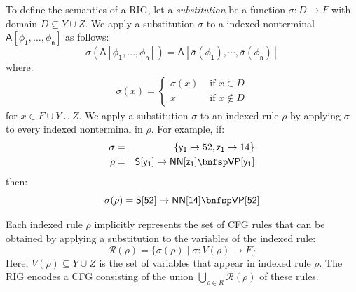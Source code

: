 \documentclass[11pt]{article}
\renewcommand{\bnfpn}[1]{\mathsf{#1}}
\renewcommand{\bnfpo}{\rightarrow}
\renewcommand{\bnfts}[1]{\mathtt{#1}}
\begin{document}
To define the semantics of a RIG, let a \emph{substitution} be a function $\sigma: D \rightarrow F$ with domain $D \subseteq Y \cup Z$. We apply a substitution $\sigma$ to a indexed nonterminal $\bnfpn{A[\phi_1, \dots, \phi_n]}$ as follows:
\begin{equation*}
\sigma(\bnfpn{A[\phi_1, \dots, \phi_n]}) = \bnfpn{A[\bar{\sigma}(\phi_1), \cdots, \bar{\sigma}(\phi_n)]}
\end{equation*}
where:
\begin{gather*}
\bar{\sigma}(x) = \begin{cases}
         \sigma(x) &\mbox{ if } x \in D\\
         x &\mbox{ if } x \not\in D
       \end{cases}
\end{gather*}
\noindent for $x \in F \cup Y \cup Z$. We apply a substitution $\sigma$ to an indexed rule $\rho$ by applying $\sigma$ to every indexed nonterminal in $\rho$.
For example, if:
\begin{eqnarray*}
	\sigma &=& \{ \bnfpn{y_1} \mapsto 52, \bnfpn{z_1} \mapsto 14 \} \\
	\rho &=& \bnfpn{S[y_1]} \bnfpo \bnfpn{NN[z_1]} \bnfsp \bnfpn{VP[y_1]}
\end{eqnarray*} 
then:
\begin{equation*}
\sigma(\rho) = \bnfpn{S[52]} \bnfpo \bnfpn{NN[14]} \bnfsp \bnfpn{VP[52]}
\end{equation*}



\noindent Each indexed rule $\rho$ implicitly represents the set of CFG rules that can be obtained by applying a substitution to the variables of the indexed rule:
\begin{equation*}
	\mathcal{R}(\rho) = \{\sigma(\rho) \mid \sigma: V(\rho) \rightarrow F \}
\end{equation*}
Here, $V(\rho) \subseteq Y \cup Z$ is the set of variables that appear in indexed rule $\rho$. The RIG encodes a CFG consisting of the union $\bigcup_{\rho \in R} \mathcal{R}(\rho)$ of these rules.

\end{document}
